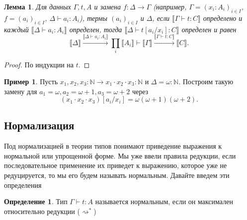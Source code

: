 \documentclass[openany]{book}
\theoremstyle{plain}
\newtheorem{lem}[thm]{Лемма}
\theoremstyle{definition}
\newtheorem{defn}{Определение}[section]
\newtheorem{eg}{Пример}[]
\newcommand{\N}{\mathbb{N}}
\begin{document}
\begin{lem}
    Для данных \(\Gamma, t, A\) и замена \(f : \Delta \to \Gamma\) (например, \(\Gamma = (x_i : A_i)_{i \in I}\), \(f = (a_i)_{i \in I}\), \(\Delta \vdash a_i : A_i\)), термы \((a_i)_{i \in I}\) и \(\Delta\), если \(\llbracket \Gamma \vdash t : C \rrbracket\) определено и каждый \(\llbracket \Delta \vdash a_i : A_i \rrbracket\) определен, тогда \(\llbracket \Delta \vdash t[a_i/x_i] : C \rrbracket\) определен и равен \[\llbracket \Delta \rrbracket \overset{\llbracket \Delta \vdash a_i : A_i \rrbracket}{\longrightarrow} \prod_i \llbracket A_i \rrbracket \vdash \llbracket \Gamma \rrbracket \overset{\llbracket \Gamma \vdash t : C \rrbracket}{\longrightarrow} \llbracket C \rrbracket.\]
\end{lem}
\begin{proof}
    По индукции на \(t\).
\end{proof}

\begin{eg}
    Пусть \(x_1, x_2, x_3 : \N \to x_1 \cdot x_2 \cdot x_3 : \N\) и \(\Delta = \omega : \N\). Построим такую замену для \(a_1 = \omega, a_2 = \omega + 1, a_3 = \omega + 2\) через \[(x_1 \cdot x_2 \cdot x_3)[a_i/x_i] = \omega (\omega + 1)(\omega + 2).\]
    \begin{center}
    \end{center}
\end{eg}

\subsection{Нормализация}

Под нормализацией в теории типов понимают приведение выражения к нормальной или упрощенной форме. Мы уже ввели правила редукции, если последовательное применение их приведет к выражению, которое уже не редуцируется, то мы его будем называть нормальным. Давайте введем эти определения
\begin{defn}
    Тип \(\Gamma \vdash t: A\) называется нормальным, если он максимален относительно редукции (\(\rightsquigarrow^*\))
\end{defn}
\end{document}
